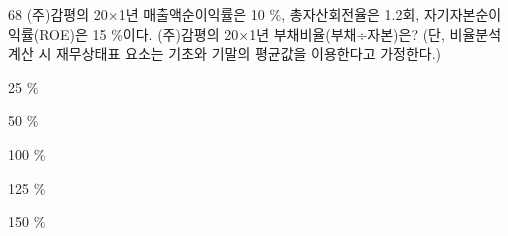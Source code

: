 \begin{question}{68}
(주)감평의 20×1년 매출액순이익률은 10 \%, 총자산회전율은 1.2회, 자기자본순이익률(ROE)은 15 \%이다. (주)감평의 20×1년 부채비율(부채÷자본)은? (단, 비율분석 계산 시 재무상태표 요소는 기초와 기말의 평균값을 이용한다고 가정한다.)
\begin{choices}
  \item 25 \%
  \item 50 \%
  \item 100 \%
  \item 125 \%
  \item 150 \%
\end{choices}
\end{question}
